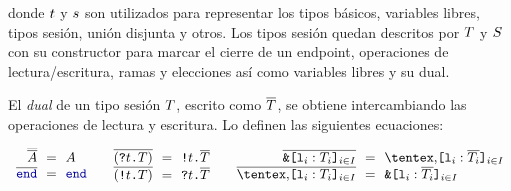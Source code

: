 donde $t$ y $s$ son utilizados para representar los tipos básicos,
variables libres, tipos sesión, unión disjunta y otros.
Los tipos sesión quedan descritos por $T$ y $S$ con su
constructor para marcar el cierre de un endpoint, operaciones de
lectura/escritura, ramas y elecciones así como variables libres y su dual.

El \emph{dual} de un tipo sesión $T$, escrito como
$\overline{T}$, se obtiene intercambiando las operaciones de lectura y
escritura. Lo definen las siguientes ecuaciones:

\[
\begin{array}{c}
  \begin{array}{@{}r@{~~}c@{~~}l@{}}
    \smash{\dual{\dual\etvar}} & = & \etvar \\
    \dual\End & = & \End \\
  \end{array}
  \qquad
  \begin{array}{@{}r@{~~}c@{~~}l@{}}
    \dual{(\In\Type\SessionType)} & = & \Out\Type\dual\SessionType \\
    \dual{(\Out\Type\SessionType)} & = & \In\Type\dual\SessionType \\
  \end{array}
  \qquad
  \begin{array}{@{}r@{~~}c@{~~}l@{}}
    \dual{\Branch \set[i\in I]{\Tag_i : \SessionType_i}}
    & = & \Choice \set[i\in I]{\Tag_i : \dual{\SessionType_i}} \\
    \dual{\Choice \set[i\in I]{\Tag_i : \SessionType_i}}
    & = & \Branch \set[i\in I]{\Tag_i : \dual{\SessionType_i}} \\
  \end{array}
\end{array}
\]
